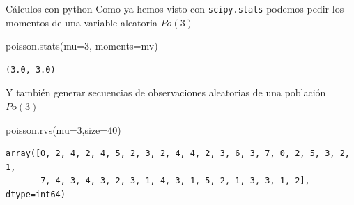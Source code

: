 \documentclass[
  ignorenonframetext,
  aspectratio=169]{beamer}
\newenvironment{Shaded}{\begin{snugshade}}{\end{snugshade}}
\newcommand{\DecValTok}[1]{\textcolor[rgb]{0.68,0.00,0.00}{#1}}
\newcommand{\NormalTok}[1]{\textcolor[rgb]{0.00,0.23,0.31}{#1}}
\newcommand{\OperatorTok}[1]{\textcolor[rgb]{0.37,0.37,0.37}{#1}}
\newcommand{\StringTok}[1]{\textcolor[rgb]{0.13,0.47,0.30}{#1}}
\begin{document}
\begin{frame}[fragile]{Cálculos con python}
\protect\hypertarget{cuxe1lculos-con-python-9}{}
Como ya hemos visto con \texttt{scipy.stats} podemos pedir los momentos
de una variable aleatoria \(Po(3)\)

\begin{Shaded}
\begin{Highlighting}[]
\NormalTok{poisson.stats(mu}\OperatorTok{=}\DecValTok{3}\NormalTok{, moments}\OperatorTok{=}\StringTok{\textquotesingle{}mv\textquotesingle{}}\NormalTok{)}
\end{Highlighting}
\end{Shaded}

\begin{verbatim}
(3.0, 3.0)
\end{verbatim}

Y también generar secuencias de observaciones aleatorias de una
población \(Po(3)\)

\begin{Shaded}
\begin{Highlighting}[]
\NormalTok{poisson.rvs(mu}\OperatorTok{=}\DecValTok{3}\NormalTok{,size}\OperatorTok{=}\DecValTok{40}\NormalTok{)}
\end{Highlighting}
\end{Shaded}

\begin{verbatim}
array([0, 2, 4, 2, 4, 5, 2, 3, 2, 4, 4, 2, 3, 6, 3, 7, 0, 2, 5, 3, 2, 1,
       7, 4, 3, 4, 3, 2, 3, 1, 4, 3, 1, 5, 2, 1, 3, 3, 1, 2], dtype=int64)
\end{verbatim}
\end{frame}
\end{document}
